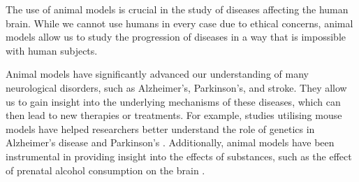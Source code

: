 \documentclass[10pt]{article}
\begin{document}
\begin{sloppypar}
  \vspace{10pt} %
  \begin{table}[ht]
    \centering
    \renewcommand{\arraystretch}{1.5}
    \setlength{\tabcolsep}{12pt}
    \caption{Overview of in vitro, in vivo, and in silico research methods.}
    \label{tab:overview-research-methods}
  \end{table}

  The use of animal models is crucial in the study of diseases affecting the human brain. While we cannot use humans in every case due to ethical concerns, animal models allow us to study the progression of diseases in a way that is impossible with human subjects.

  Animal models have significantly advanced our understanding of many neurological disorders, such as Alzheimer’s, Parkinson’s, and stroke. They allow us to gain insight into the underlying mechanisms of these diseases, which can then lead to new therapies or treatments. For example, studies utilising mouse models have helped researchers better understand the role of genetics in Alzheimer’s disease \citep{holtzman_alzheimers_2011} and Parkinson’s \citep{hernandez_genetics_2016}. Additionally, animal models have been instrumental in providing insight into the effects of substances, such as the effect of prenatal alcohol consumption on the brain \citep{bisen_proteomic_2019}.


\end{sloppypar}
\end{document}
